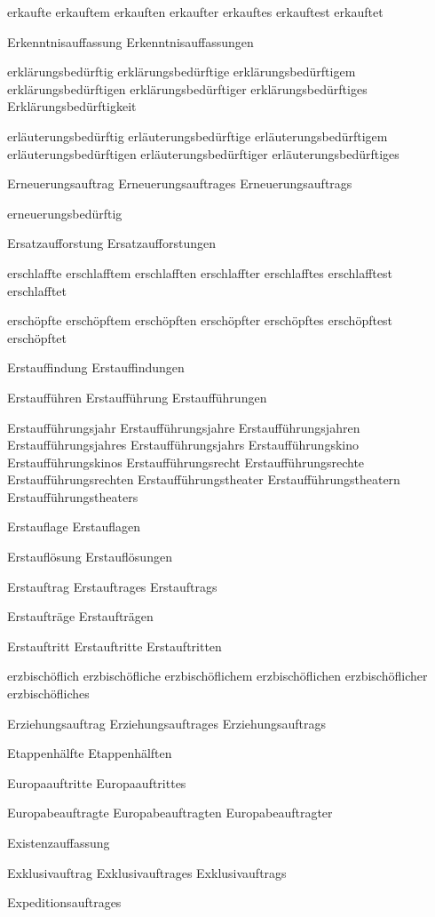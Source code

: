 erkaufte
erkauftem
erkauften
erkaufter
erkauftes
erkauftest
erkauftet

Erkenntnisauffassung
Erkenntnisauffassungen

erklärungsbedürftig
erklärungsbedürftige
erklärungsbedürftigem
erklärungsbedürftigen
erklärungsbedürftiger
erklärungsbedürftiges
Erklärungsbedürftigkeit

erläuterungsbedürftig
erläuterungsbedürftige
erläuterungsbedürftigem
erläuterungsbedürftigen
erläuterungsbedürftiger
erläuterungsbedürftiges

Erneuerungsauftrag
Erneuerungsauftrages
Erneuerungsauftrags

erneuerungsbedürftig

Ersatzaufforstung
Ersatzaufforstungen

erschlaffte
erschlafftem
erschlafften
erschlaffter
erschlafftes
erschlafftest
erschlafftet

erschöpfte
erschöpftem
erschöpften
erschöpfter
erschöpftes
erschöpftest
erschöpftet

Erstauffindung
Erstauffindungen

Erstaufführen
Erstaufführung
Erstaufführungen

Erstaufführungsjahr
Erstaufführungsjahre
Erstaufführungsjahren
Erstaufführungsjahres
Erstaufführungsjahrs
Erstaufführungskino
Erstaufführungskinos
Erstaufführungsrecht
Erstaufführungsrechte
Erstaufführungsrechten
Erstaufführungstheater
Erstaufführungstheatern
Erstaufführungstheaters

Erstauflage
Erstauflagen

Erstauflösung
Erstauflösungen

Erstauftrag
Erstauftrages
Erstauftrags

Erstaufträge
Erstaufträgen

Erstauftritt
Erstauftritte
Erstauftritten

erzbischöflich
erzbischöfliche
erzbischöflichem
erzbischöflichen
erzbischöflicher
erzbischöfliches

Erziehungsauftrag
Erziehungsauftrages
Erziehungsauftrags

Etappenhälfte
Etappenhälften

Europaauftritte
Europaauftrittes

Europabeauftragte
Europabeauftragten
Europabeauftragter

Existenzauffassung

Exklusivauftrag
Exklusivauftrages
Exklusivauftrags

Expeditionsauftrages


